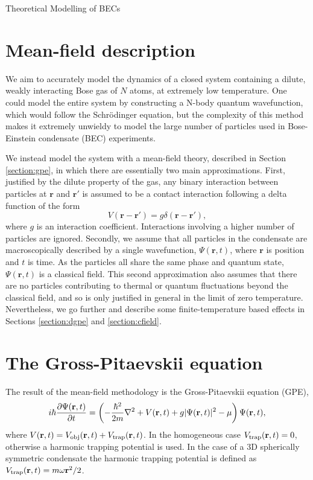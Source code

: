 \begin{chapter}{\label{cha:theoretical_model}Theoretical Modelling of BECs}
\section{\label{section:meanfield} Mean-field description}
We aim to accurately model the dynamics of a closed system containing a dilute, weakly interacting Bose gas of $N$ atoms, at extremely low temperature. One could model the entire system by constructing a N-body quantum wavefunction, which would follow the Schr\"odinger equation, but the complexity of this method makes it extremely unwieldy to model the large number of particles used in Bose-Einstein condensate (BEC) experiments.

We instead model the system with a mean-field theory, described in Section \ref{section:gpe}, in which there are essentially two main approximations. First, justified by the dilute property of the gas, any binary interaction between particles at $\mathbf{r}$ and $\mathbf{r}'$ is assumed to be a contact interaction following a delta function of the form
\begin{equation*}
V(\mathbf{r}-\mathbf{r}') = g \delta(\mathbf{r}-\mathbf{r}'),
\end{equation*}
where $g$ is an interaction coefficient. Interactions involving a higher number of particles are ignored. Secondly, we assume that all particles in the condensate are macroscopically described by a single wavefunction, $\Psi(\mathbf{r},t)$, where $\mathbf{r}$ is position and $t$ is time. As the particles all share the same phase and quantum state, $\Psi(\mathbf{r},t)$ is a classical field. This second approximation also assumes that there are no particles contributing to thermal or quantum fluctuations beyond the classical field, and so is only justified in general in the limit of zero temperature. Nevertheless, we go further and describe some finite-temperature based effects in Sections \ref{section:dgpe}
and \ref{section:cfield}.

\section{\label{section:gpe} The Gross-Pitaevskii equation}
The result of the mean-field methodology is the Gross-Pitaevskii equation (GPE), 
\begin{equation}
i \hbar \frac{\partial\Psi({\bf r},t)}{\partial t} = \left(-\frac{\hbar^2}{2m}\nabla^2 + V({\bf r},t) + g|\Psi({\bf r},t)|^2 - \mu \right) \Psi({\bf r},t),
\label{eq:gpe}
\end{equation}
where $V({\bf r},t) = V_{\mathrm{obj}}({\bf r},t) + V_{\mathrm{trap}}({\bf r},t)$. In the homogeneous case $V_{\mathrm{trap}}({\bf r},t)=0$, otherwise a harmonic trapping potential is used. In the case of a 3D spherically symmetric condensate the harmonic trapping potential is defined as $V_{\mathrm{trap}}({\bf r},t)=m\omega{\bf r}^2/2$.


\end{chapter}
